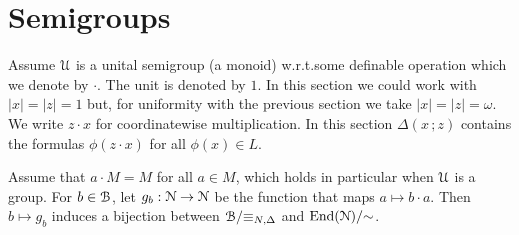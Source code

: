 





\section{Semigroups}\label{semigroups}

Assume $\EuScript U$ is a unital semigroup (a monoid) w.r.t.\@ some definable operation which we denote by $\cdot$.
The unit is denoted by $1$.
In this section we could work with $|x|=|z|=1$ but, for uniformity with the previous section we take $|x|=|z|=\omega$.
We write $z\cdot x$ for coordinatewise multiplication.
In this section $\Delta(x\,;z)$ contains the formulas $\phi(z\cdot x)$ for all $\phi(x)\in L$.

\begin{fact}
  Assume that $a\cdot M=M$ for all $a\in M$, which holds in particular when $\EuScript U$ is a group.
  For $b\in\EuScript B$, let $g_b:\EuScript N\to\EuScript N$ be the function that maps $a\mapsto b\cdot a$.
  Then $b\mapsto g_b$ induces a bijection between $\EuScript B/{\equiv_{N,\Delta}}$ and ${\rm End}(\EuScript N)/{\sim}$.
\end{fact}

